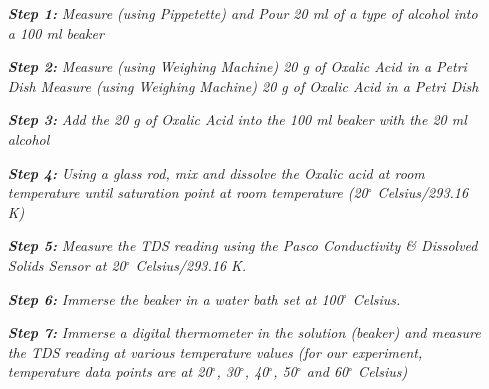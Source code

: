 \textit{}

\begin{enumerate}
    \item[\textbf{\textit{Step 1:}}] \textit{Measure (using Pippetette) and Pour 20 ml of a type of alcohol into a 100 ml beaker}
    \item[\textbf{\textit{Step 2:}}] \textit{Measure (using Weighing Machine) 20 g of Oxalic Acid in a Petri Dish Measure (using Weighing Machine) 20 g of Oxalic Acid in a Petri Dish }
    \item[\textbf{\textit{Step 3:}}] \textit{Add the 20 g of Oxalic Acid into the 100 ml beaker with the 20 ml alcohol}
    \item[\textbf{\textit{Step 4:}}] \textit{Using a glass rod, mix and dissolve the Oxalic acid at room temperature until saturation point at room temperature (20$^\circ$ Celsius/293.16 K)}
    \item[\textbf{\textit{Step 5:}}] \textit{Measure the TDS reading using the Pasco Conductivity & Dissolved Solids Sensor at 20$^\circ$ Celsius/293.16 K.}
    \item[\textbf{\textit{Step 6:}}] \textit{Immerse the beaker in a water bath set at 100$^\circ$ Celsius.}
    \item[\textbf{\textit{Step 7:}}] \textit{Immerse a digital thermometer in the solution (beaker) and measure the TDS reading at various temperature values (for our experiment, temperature data points are at 20$^\circ$, 30$^\circ$, 40$^\circ$, 50$^\circ$ and 60$^\circ$ Celsius)}
    \label{pro}
\end{enumerate}